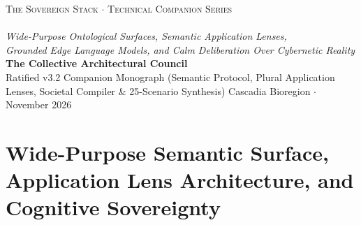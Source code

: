 \documentclass[11pt,a4paper]{book}
\DeclareRobustCommand{\_}{\ifmmode\text{\symbol{95}}\else\symbol{95}\allowbreak\fi}
\theoremstyle{plain}
\theoremstyle{definition}
\begin{document}
\frontmatter
\begin{titlepage}
    \thispagestyle{empty}
    \begin{center}
        \vspace*{3.0cm}
        {\Large \textsc{The Sovereign Stack $\cdot$ Technical Companion Series}} \\[1.1cm]
        {} \\[0.85cm]
        {\Large \textit{Wide-Purpose Ontological Surfaces, Semantic Application Lenses,}} \\[0.25cm]
        {\Large \textit{Grounded Edge Language Models, and Calm Deliberation Over Cybernetic Reality}} \\[2.5cm]
        {\large \textbf{The Collective Architectural Council}} \\[0.4cm]
        {\normalsize Ratified v3.2 Companion Monograph (Semantic Protocol, Plural Application Lenses, Societal Compiler \& 25-Scenario Synthesis)}
        \vfill
        {\large Cascadia Bioregion $\cdot$ November 2026}
        \vspace*{2.0cm}
    \end{center}
    \clearpage
\end{titlepage}

\tableofcontents



\mainmatter

\part{Wide-Purpose Semantic Surface, Application Lens Architecture, and Cognitive Sovereignty}










\end{document}
